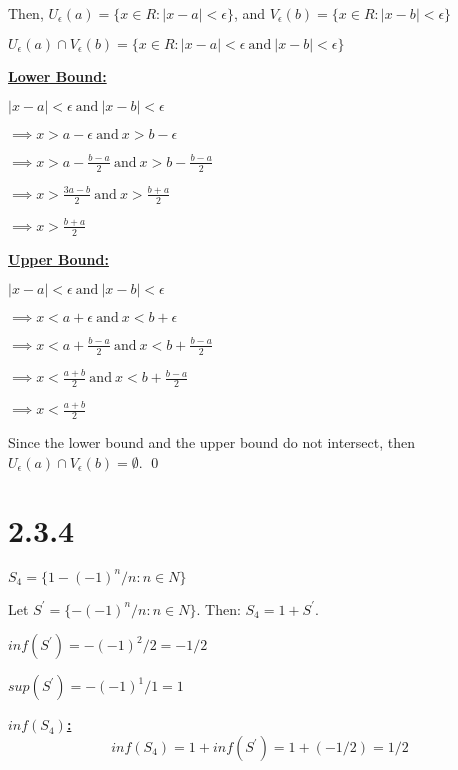 \documentclass{article}
\begin{document}
\noindent
Then, $U_{\epsilon}(a)=\{x \in R: |x-a| < \epsilon\}$, and $V_{\epsilon}(b)=\{x \in R: |x-b| < \epsilon\}$
\newline

\noindent
$U_{\epsilon}(a) \cap V_{\epsilon}(b) = \{x \in R: |x-a| < \epsilon \ \text{and} \ |x-b| < \epsilon\}$
\newline

\noindent
\textbf{\underline{Lower Bound:}}
$ $

$|x-a| < \epsilon \ \text{and} \ |x-b| < \epsilon$ 

$\implies x > a-\epsilon \ \text{and} \ x > b-\epsilon$ 

$\implies x > a-\frac{b-a}{2} \ \text{and} \  x > b - \frac{b-a}{2}$

$\implies x > \frac{3a-b}{2} \ \text{and} \  x > \frac{b+a}{2}$

$\implies x > \frac{b+a}{2}$
\newline

\noindent
\textbf{\underline{Upper Bound:}}
$ $

$|x-a| < \epsilon \ \text{and} \ |x-b| < \epsilon$ 

$\implies x < a+\epsilon \ \text{and} \ x < b+\epsilon$ 

$\implies x < a+\frac{b-a}{2} \ \text{and} \  x < b + \frac{b-a}{2}$

$\implies x < \frac{a+b}{2} \ \text{and} \  x < b+ \frac{b-a}{2}$

$\implies x < \frac{a+b}{2}$
\newline

\noindent
Since the lower bound and the upper bound do not intersect, then $U_{\epsilon}(a) \cap V_{\epsilon}(b) = \emptyset$.
\qed

\section*{2.3.4}
$S_4 = \{1-(-1)^n/n: n \in N\}$
\newline

\noindent
Let $S^\prime= \{-(-1)^n/n: n \in N\}$. Then: $S_4 = 1 + S^\prime $.
\newline

\noindent
$inf(S^\prime) = -(-1)^2/2 = -1/2$
\newline

\noindent
$sup(S^\prime) = -(-1)^1/1 = 1$
\newline

\noindent
\textbf{\underline{$inf(S_4)$:}}
\begin{equation*}
  inf(S_4) = 1 + inf(S^\prime) = 1 + (-1/2) = 1/2
\end{equation*}
\newline
\end{document}
